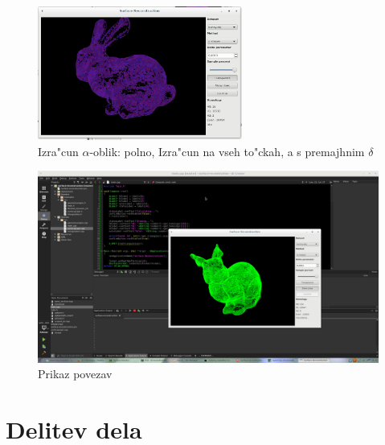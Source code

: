 \documentclass[11pt]{article}
\begin{document}
\begin{figure}[htb]
    \centering
    \includegraphics[width=0.6\textwidth]{alpha_lowdelta.png}
    \caption{Izra"cun $\alpha$-oblik: polno, Izra"cun na vseh to"ckah, a s premajhnim $\delta$}
    \label{fig:a1}
\end{figure}

\begin{figure}[htb]
    \centering
    \includegraphics[width=\textwidth]{lines.png}
    \caption{Prikaz povezav}
    \label{fig:edges}
\end{figure}

\section{Delitev dela}
\end{document}
